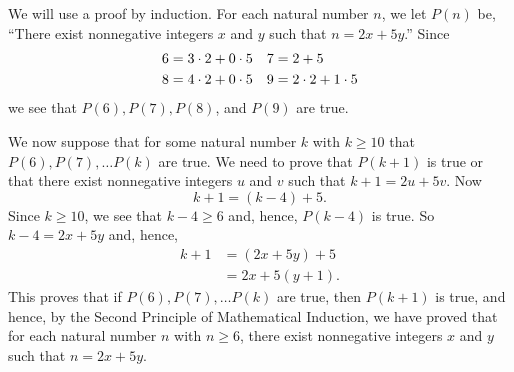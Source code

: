 \begin{enumerate}
\begin{enumerate}
\quarter
\begin{myproof}
We will use a proof by induction.  For each natural number $n$, we let $P( n )$ be, 
``There exist nonnegative integers $x$ and $y$ such that $n = 2x + 5y$.''
Since
\begin{align} \notag
6 &= 3 \cdot 2 + 0 \cdot 5  &  7 &= 2 + 5 \\ \notag
8 &= 4 \cdot 2 + 0 \cdot 5  &  9 &= 2 \cdot 2 + 1 \cdot 5 \notag 
\end{align}
we see that $P(6 ), P(7 ), P(8 )$, and $P( 9 )$ are true.  

We now suppose that for some natural number $k$ with $k \geq 10$ that 
$P(6 ), P (7 ), \ldots P (k )$ are true.  We need to prove that $P(k + 1)$ is true or that there exist nonnegative integers $u$ and $v$ such that $k + 1 = 2u + 5v$.  Now
\[
k + 1 = \left(k - 4 \right) + 5.
\]
Since $k \geq 10$, we see that $k - 4 \geq 6$ and, hence, $P(k - 4 )$ is true.  So
$k - 4 = 2x + 5y$ and, hence,
\[
\begin{aligned}
k + 1 &= \left(2x + 5y \right) + 5 \\
      &= 2x + 5 \left(y + 1 \right)\!.
\end{aligned}
\]
This proves that if $P(6 ), P (7 ), \ldots P (k )$ are true, then $P(k + 1)$ is true, and hence, by the Second Principle of Mathematical Induction, we have proved that for each natural number $n$ with $n \geq 6$, there exist nonnegative integers $x$ and $y$ such that $n = 2x + 5y$.     
\end{myproof}
\end{enumerate}
\end{enumerate}



